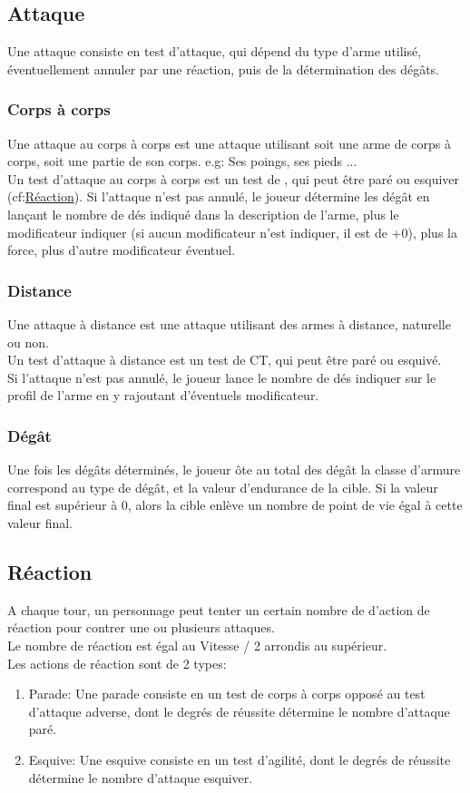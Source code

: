 \subsection{Attaque}
Une attaque consiste en test d'attaque, qui dépend du type d'arme utilisé, éventuellement annuler par une réaction, puis de la détermination des dégâts.
\subsubsection*{Corps à corps}
Une attaque au corps à corps est une attaque utilisant soit une arme de corps à corps, soit une partie de son corps. e.g: Ses poings, ses pieds ... \\
Un test d'attaque au corps à corps est un test de , qui peut être paré ou esquiver (cf:\hyperlink{reac}{Réaction}). Si l'attaque n'est pas annulé, le joueur détermine les dégât en lançant le nombre de dés indiqué dans la description de l'arme, plus le modificateur indiquer (si aucun modificateur n'est indiquer, il est de +0), plus la force, plus d'autre modificateur éventuel. 

\subsubsection*{Distance}
Une attaque à distance est une attaque utilisant des armes à distance, naturelle ou non. \\
Un test d'attaque à distance est un test de CT, qui peut être paré ou esquivé. \\
Si l'attaque n'est pas annulé, le joueur lance le nombre de dés indiquer sur le profil de l'arme en y rajoutant d'éventuels modificateur.

\subsubsection*{Dégât}
Une fois les dégâts déterminés, le joueur ôte au total des dégât la classe d'armure correspond au type de dégât, et la valeur d'endurance de la cible. Si la valeur final est supérieur à 0, alors la cible enlève un nombre de point de vie égal à cette valeur final.

\hypertarget{reac}{\subsection{Réaction}}
A chaque tour, un personnage peut tenter un certain nombre de d'action de réaction pour contrer une ou plusieurs attaques. \\
Le nombre de réaction est égal au Vitesse / 2 arrondis au supérieur. \\
Les actions de réaction sont de 2 types:
\begin{enumerate}
\item Parade: Une parade consiste en un test de corps à corps opposé au test d'attaque adverse, dont le degrés de réussite détermine le nombre d'attaque paré.
\item Esquive: Une esquive consiste en un test d'agilité, dont le degrés de réussite détermine le nombre d'attaque esquiver.
\end{enumerate}


